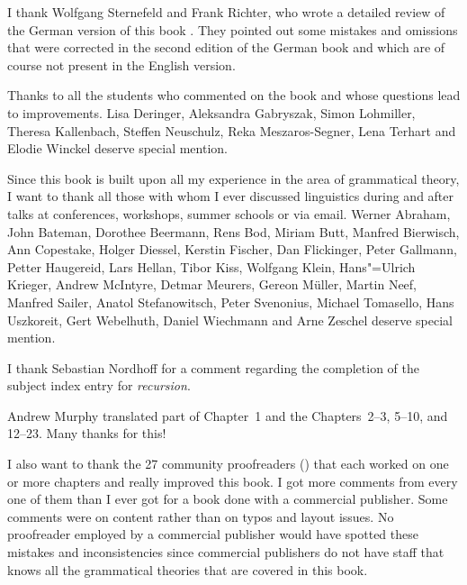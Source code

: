 I thank Wolfgang Sternefeld and Frank Richter, who wrote a detailed review of the German version of
this book \citep{SR2012a}. They pointed out some mistakes and omissions that were corrected in the second edition
of the German book and which are of course not present in the English version.

Thanks to all the students who commented on the book and whose questions lead to improvements. 
Lisa Deringer,
Aleksandra Gabryszak, %
Simon Lohmiller, %
Theresa Kallenbach, %
Steffen Neu\-schulz,  %
Reka Meszaros-Segner,
Lena Terhart and
Elodie Winckel deserve special mention.

Since this book is built upon all my experience in the area of grammatical theory, I want to thank
all those with whom I ever discussed linguistics during and after talks at conferences, workshops,
summer schools or via email.
Werner Abraham,
John Bateman,
Dorothee Beermann, 
Rens Bod, 
Miriam Butt,
Manfred Bierwisch,
Ann Copestake, 
Holger Diessel, 
Kerstin Fischer,
Dan Flickinger,
Peter Gallmann, 
Petter Haugereid,
Lars Hellan, 
Tibor Kiss,
Wolfgang Klein, 
Hans"=Ulrich Krieger,
Andrew McIntyre,
Detmar Meurers,
Gereon Müller,
Martin Neef,
Manfred Sailer, 
Anatol Stefanowitsch,
Peter Svenonius,
Michael Tomasello, 
Hans Uszkoreit, 
Gert Webelhuth, 
Daniel Wiechmann and Arne Zeschel deserve special mention.

I thank Sebastian Nordhoff for a comment regarding the completion of the subject index entry for \emph{recursion}.

\largerpage
Andrew Murphy translated part of Chapter~1 and the Chapters~2--3, 5--10, and 12--23. Many thanks for this!

I also want to thank the 27 community proofreaders (\makeatletter\@proofreader\makeatother) that each worked on one or more chapters and
really improved this book. I got more comments from every one of them than I ever got for a book
done with a commercial publisher. Some comments were on content rather than on typos and layout
issues. No proofreader employed by a commercial publisher would have spotted these mistakes and
inconsistencies since commercial publishers do not have staff that knows all the grammatical
theories that are covered in this book. 

